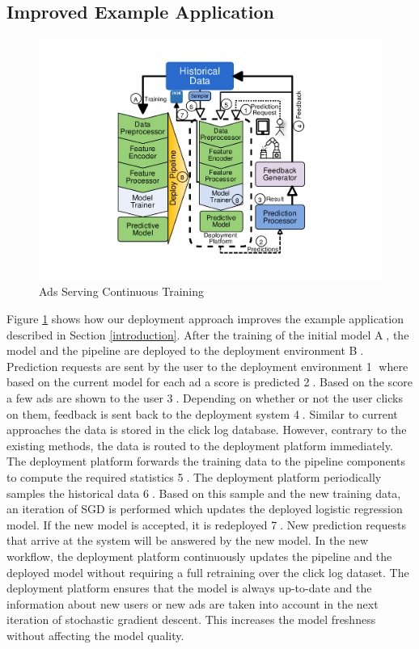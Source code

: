\subsection{Improved Example Application}
\begin{figure}[t]
\centering
\includegraphics[width=\columnwidth]{../images/generic-improved-example.pdf}
\caption{Ads Serving Continuous Training}
\label{fig:improved-example}
\end{figure}

Figure \ref{fig:improved-example} shows how our deployment approach improves the example application described in Section \ref{introduction}.
After the training of the initial model \textcircled{A}, the model and the pipeline are deployed to the deployment environment \textcircled{B}.
Prediction requests are sent by the user to the deployment environment \textcircled{1} where based on the current model for each ad a score is predicted \textcircled{2}.
Based on the score a few ads are shown to the user \textcircled{3}.
Depending on whether or not the user clicks on them, feedback is sent back to the deployment system \textcircled{4}.
Similar to current approaches the data is stored in the click log database.
However, contrary to the existing methods, the data is routed to the deployment platform immediately.
The deployment platform forwards the training data to the pipeline components to compute the required statistics \textcircled{5}.
The deployment platform periodically samples the historical data \textcircled{6}.
Based on this sample and the new training data, an iteration of SGD is performed which updates the deployed logistic regression model.
If the new model is accepted, it is redeployed \textcircled{7}.
New prediction requests that arrive at the system will be answered by the new model.
In the new workflow, the deployment platform continuously updates the pipeline and the deployed model without requiring a full retraining over the click log dataset.
The deployment platform ensures that the model is always up-to-date and the information about new users or new ads are taken into account in the next iteration of stochastic gradient descent.
This increases the model freshness without affecting the model quality.